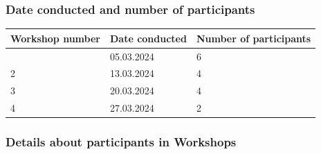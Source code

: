 \documentclass[
  letterpaper,
  DIV=11,
  numbers=noendperiod]{scrreport}
\begin{document}
\hypertarget{date-conducted-and-number-of-participants}{%
\subsubsection*{Date conducted and number of
participants}\label{date-conducted-and-number-of-participants}}

\begin{longtable}[]{@{}lll@{}}
\toprule\noalign{}
Workshop number & Date conducted & Number of participants \\
\midrule\noalign{}
\endhead
\bottomrule\noalign{}
\endlastfoot
1 & 05.03.2024 & 6 \\
2 & 13.03.2024 & 4 \\
3 & 20.03.2024 & 4 \\
4 & 27.03.2024 & 2 \\
\end{longtable}

\hypertarget{details-about-participants-in-workshops}{%
\subsubsection*{Details about participants in
Workshops}\label{details-about-participants-in-workshops}}
\end{document}
